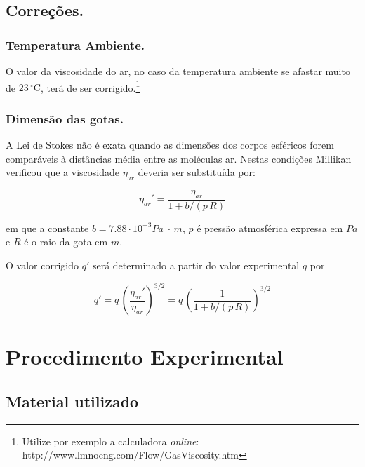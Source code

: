 \documentclass[a4paper,twoside,12pt]{article}      %
\begin{document}
\subsection{\sf Correções.}
\subsubsection{\sf Temperatura Ambiente.}

O valor  da viscosidade do ar, no caso da temperatura ambiente se afastar muito de $23\,^{\circ}\mathrm{C}$, terá de ser corrigido.\footnote{Utilize por exemplo a calculadora \emph{online}: http://www.lmnoeng.com/Flow/GasViscosity.htm}

\subsubsection{\sf Dimensão das gotas.}

A Lei de Stokes não é exata quando as dimensões dos corpos esféricos forem comparáveis à distâncias
média entre as moléculas ar.
Nestas condições Millikan verificou que a viscosidade $\eta_{ar}$ deveria ser substituída por:

\begin{equation}
	\label{eq:correcao}
	\eta_{ar}' = \frac{\eta_{ar}}{1 + b/(p\,R)}  
\end{equation}

em que a constante $b=7.88\cdot 10^{-3}Pa\;\cdot \,m$, 
$p$ é pressão atmosférica expressa em $Pa$ e $R$ é o raio da gota em $m$.

O valor corrigido $q'$ será  determinado a partir do valor experimental $q$ por

\begin{equation}
	\label{eq:correcao1}
	q' = q\, \left(\frac{\eta_{ar}'}{\eta_{ar}}\right)^{3/2}  =q\, \left(\frac{1}{1 + b/(p\,R)}\right)^{3/2}  
\end{equation}

\newpage
\section{\sf Procedimento Experimental}



\subsection{\sf Material utilizado}
\end{document}
